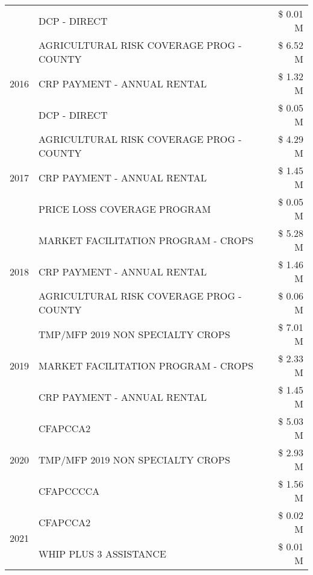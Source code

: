 \begin{tabular}{llr}
 & DCP - DIRECT & \$ 0.01 M \\
\cline{1-3}
\multirow[t]{3}{*}{2016} & AGRICULTURAL RISK COVERAGE PROG - COUNTY      & \$ 6.52 M \\
 & CRP PAYMENT - ANNUAL RENTAL                   & \$ 1.32 M \\
 & DCP - DIRECT                                  & \$ 0.05 M \\
\cline{1-3}
\multirow[t]{3}{*}{2017} & AGRICULTURAL RISK COVERAGE PROG - COUNTY & \$ 4.29 M \\
 & CRP PAYMENT - ANNUAL RENTAL & \$ 1.45 M \\
 & PRICE LOSS COVERAGE PROGRAM & \$ 0.05 M \\
\cline{1-3}
\multirow[t]{3}{*}{2018} & MARKET FACILITATION PROGRAM - CROPS & \$ 5.28 M \\
 & CRP PAYMENT - ANNUAL RENTAL & \$ 1.46 M \\
 & AGRICULTURAL RISK COVERAGE PROG - COUNTY & \$ 0.06 M \\
\cline{1-3}
\multirow[t]{3}{*}{2019} & TMP/MFP 2019 NON SPECIALTY CROPS & \$ 7.01 M \\
 & MARKET FACILITATION PROGRAM - CROPS & \$ 2.33 M \\
 & CRP PAYMENT - ANNUAL RENTAL & \$ 1.45 M \\
\cline{1-3}
\multirow[t]{3}{*}{2020} & CFAPCCA2 & \$ 5.03 M \\
 & TMP/MFP 2019 NON SPECIALTY CROPS & \$ 2.93 M \\
 & CFAPCCCCA & \$ 1.56 M \\
\cline{1-3}
\multirow[t]{2}{*}{2021} & CFAPCCA2 & \$ 0.02 M \\
 & WHIP PLUS 3 ASSISTANCE & \$ 0.01 M \\
\cline{1-3}
\bottomrule
\end{tabular}
